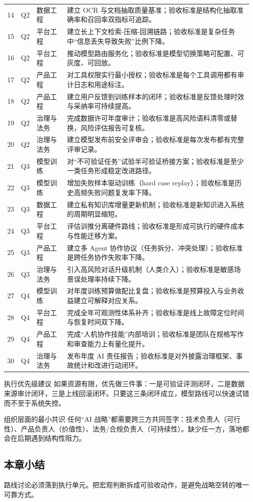 \begin{longtable}{p{}p{}p{}p{}}
14 & Q2 & 数据工程 & 建立 OCR 与文档抽取质量基准；验收标准是结构化抽取准确率和召回率双指标可追踪。 \\
15 & Q2 & 平台工程 & 建立长上下文检索-压缩-回溯链路；验收标准是复杂任务中“信息丢失导致失败”比例下降。 \\
16 & Q2 & 平台工程 & 推动模型路由服务化；验收标准是模型切换策略可配置、可灰度、可回放。 \\
17 & Q2 & 产品工程 & 对工具权限实行最小授权；验收标准是每个工具调用都有审计日志和用途标注。 \\
18 & Q2 & 产品工程 & 建立用户反馈到训练样本的闭环；验收标准是反馈处理时效与采纳率可持续提高。 \\
19 & Q2 & 治理与法务 & 完成数据许可年度审计；验收标准是高风险语料清零或替换，风险评估报告可复核。 \\
20 & Q2 & 治理与法务 & 建立模型发布前安全评审会；验收标准是每次发布都有完整评审记录。 \\
21 & Q3 & 模型训练 & 对“不可验证任务”试验半可验证桥接方案；验收标准是至少一类任务形成稳定改进路径。 \\
22 & Q3 & 模型训练 & 增加失败样本驱动训练（hard case replay）；验收标准是历史高频失败问题复发率下降。 \\
23 & Q3 & 数据工程 & 建立私有知识库增量更新机制；验收标准是新知识进入系统的周期明显缩短。 \\
24 & Q3 & 平台工程 & 评估训推分离硬件路线；验收标准是形成可执行的硬件成本与性能迁移方案。 \\
25 & Q3 & 产品工程 & 建立多 Agent 协作协议（任务拆分、冲突处理）；验收标准是跨任务协作失败率下降。 \\
26 & Q3 & 治理与法务 & 引入高风险对话升级机制（人类介入）；验收标准是敏感场景误处理率持续下降。 \\
27 & Q4 & 模型训练 & 对年度训练预算做配比复盘；验收标准是预算投入与业务收益建立可解释对应关系。 \\
28 & Q4 & 平台工程 & 完成全年可观测性体系补齐；验收标准是线上故障定位时间与恢复时间双下降。 \\
29 & Q4 & 产品工程 & 完成“人机协作技能”内部培训；验收标准是团队在规格写作和审查能力上有量化提升。 \\
30 & Q4 & 治理与法务 & 发布年度 AI 责任报告；验收标准是对外披露治理框架、事故统计和改进行动闭环。 \\
\bottomrule
\end{longtable}

\begin{importantbox}{执行优先级建议}
如果资源有限，优先做三件事：一是可验证评测闭环，二是数据来源审计闭环，三是上线回滚闭环。只要这三条闭环成立，模型路线可以快速试错而不至于系统失控。
\end{importantbox}

\begin{knowledgebox}{组织层面的最小共识}
任何“AI 战略”都需要跨三方共同签字：技术负责人（可行性）、产品负责人（价值性）、法务/合规负责人（可持续性）。缺少任一方，落地都会在后期遇到结构性阻力。
\end{knowledgebox}

\subsection{本章小结}

路线讨论必须落到执行单元。把宏观判断拆成可验收动作，是避免战略空转的唯一可靠方式。

